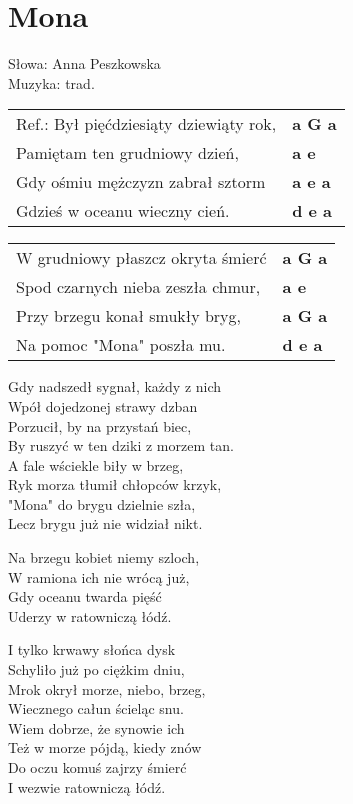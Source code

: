 \section{Mona}

Słowa: Anna Peszkowska\\
Muzyka:  trad.

\vspace{2em}
\begin{tabular}{@{}p{7cm}@{}l@{}}
Ref.: Był pięćdziesiąty dziewiąty rok, & \bfseries  a G a \\
Pamiętam ten grudniowy dzień, & \bfseries  a e \\
Gdy ośmiu mężczyzn zabrał sztorm & \bfseries a e a \\
Gdzieś w oceanu wieczny cień. & \bfseries  d e a \\
\end{tabular}

\vspace{1em}
\begin{tabular}{@{}p{7cm}@{}l@{}}
W grudniowy płaszcz okryta śmierć & \bfseries  a G a \\
Spod czarnych nieba zeszła chmur, & \bfseries a e \\
Przy brzegu konał smukły bryg, & \bfseries  a G a \\
Na pomoc "Mona" poszła mu. & \bfseries  d e a \\
\end{tabular}

\vspace{1em}
Gdy nadszedł sygnał, każdy z nich \\
Wpół dojedzonej strawy dzban \\
Porzucił, by na przystań biec, \\
By ruszyć w ten dziki z morzem tan. \\

A fale wściekle biły w brzeg, \\
Ryk morza tłumił chłopców krzyk, \\
"Mona" do brygu dzielnie szła, \\
Lecz brygu już nie widział nikt. \\

\vspace{-1em}
\begin{multicols}{2}
Na brzegu kobiet niemy szloch, \\
W ramiona ich nie wrócą już, \\
Gdy oceanu twarda pięść \\
Uderzy w ratowniczą łódź. \\
\newcolumn

I tylko krwawy słońca dysk \\
Schyliło już po ciężkim dniu, \\
Mrok okrył morze, niebo, brzeg, \\
Wiecznego całun ścieląc snu. \\

Wiem dobrze, że synowie ich \\
Też w morze pójdą, kiedy znów \\
Do oczu komuś zajrzy śmierć \\
I wezwie ratowniczą łódź.
\end{multicols}